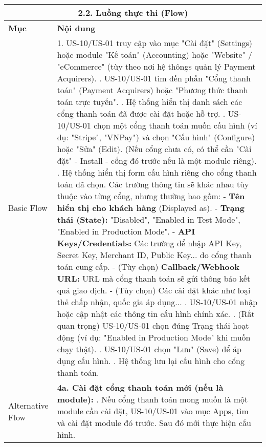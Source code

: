 \begin{longtable}{|m{4cm}|p{11cm}|}
\hline
\multicolumn{2}{|c|}{\textbf{2.2. Luồng thực thi (Flow)}} \\
\hline
\textbf{Mục} & \textbf{Nội dung} \\
\hline
Basic Flow & 1. US-10/US-01 truy cập vào mục "Cài đặt" (Settings) hoặc module "Kế toán" (Accounting) hoặc "Website" / "eCommerce" (tùy theo nơi hệ thôngs quản lý Payment Acquirers). \newline 2. US-10/US-01 tìm đến phần "Cổng thanh toán" (Payment Acquirers) hoặc "Phương thức thanh toán trực tuyến". \newline 3. Hệ thống hiển thị danh sách các cổng thanh toán đã được cài đặt hoặc hỗ trợ. \newline 4. US-10/US-01 chọn một cổng thanh toán muốn cấu hình (ví dụ: "Stripe", "VNPay") và chọn "Cấu hình" (Configure) hoặc "Sửa" (Edit). (Nếu cổng chưa có, có thể cần "Cài đặt" - Install - cổng đó trước nếu là một module riêng). \newline 5. Hệ thống hiển thị form cấu hình riêng cho cổng thanh toán đã chọn. Các trường thông tin sẽ khác nhau tùy thuộc vào từng cổng, nhưng thường bao gồm: \newline    - \textbf{Tên hiển thị cho khách hàng} (Displayed as). \newline    - \textbf{Trạng thái (State):} "Disabled", "Enabled in Test Mode", "Enabled in Production Mode". \newline    - \textbf{API Keys/Credentials:} Các trường để nhập API Key, Secret Key, Merchant ID, Public Key... do cổng thanh toán cung cấp. \newline    - (Tùy chọn) \textbf{Callback/Webhook URL:} URL mà cổng thanh toán sẽ gửi thông báo kết quả giao dịch. \newline    - (Tùy chọn) Các cài đặt khác như loại thẻ chấp nhận, quốc gia áp dụng... \newline 6. US-10/US-01 nhập hoặc cập nhật các thông tin cấu hình chính xác. \newline 7. (Rất quan trọng) US-10/US-01 chọn đúng Trạng thái hoạt động (ví dụ: "Enabled in Production Mode" khi muốn chạy thật). \newline 8. US-10/US-01 chọn "Lưu" (Save) để áp dụng cấu hình. \newline 9. Hệ thống lưu lại cấu hình cho cổng thanh toán. \\
\hline
Alternative Flow & \textbf{4a. Cài đặt cổng thanh toán mới (nếu là module):} \newline    1. Nếu cổng thanh toán mong muốn là một module cần cài đặt, US-10/US-01 vào mục Apps, tìm và cài đặt module đó trước. Sau đó mới thực hiện cấu hình. \\

\end{longtable}
